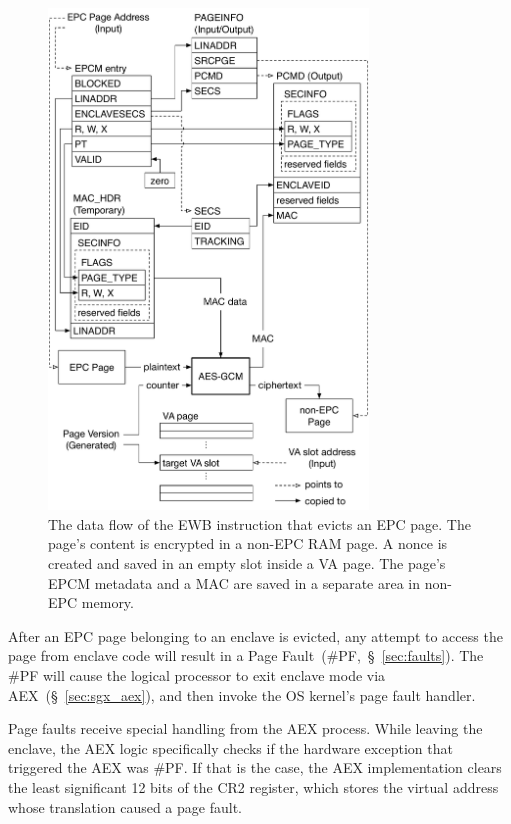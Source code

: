 \begin{figure}[hbt]
  \centering
  \includegraphics[width=85mm]{figures/sgx_ewb.pdf}
  \caption{
    The data flow of the EWB instruction that evicts an EPC page. The page's
    content is encrypted in a non-EPC RAM page. A nonce is created and saved
    in an empty slot inside a VA page. The page's EPCM metadata and a MAC
    are saved in a separate area in non-EPC memory.
  }
  \label{fig:sgx_ewb}
\end{figure}





After an EPC page belonging to an enclave is evicted, any attempt to access the
page from enclave code will result in a Page Fault~(\#PF,~\S~\ref{sec:faults}).
The \#PF will cause the logical processor to exit enclave mode via
AEX~(\S~\ref{sec:sgx_aex}), and then invoke the OS kernel's page fault handler.

Page faults receive special handling from the AEX process. While leaving the
enclave, the AEX logic specifically checks if the hardware exception that
triggered the AEX was \#PF. If that is the case, the AEX implementation clears
the least significant 12 bits of the CR2 register, which stores the virtual
address whose translation caused a page fault.

